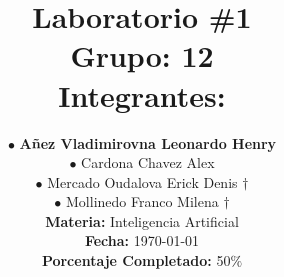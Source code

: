 
\newcommand{\NumeroLaboratorio}{1}		%
\newcommand{\PorcentajeCompletado}{50}	%





\title{
\hspace{-0.1cm}\LARGE{Laboratorio \#\NumeroLaboratorio} \\\vspace{0.05cm}
{\large Grupo: 12} \\\vspace{0.2cm}
{\large Integrantes:} \\\vspace{0.2cm}
}

\author{
\hspace{0.5cm}$\bullet$ \textbf{Añez Vladimirovna Leonardo Henry}\\
\hspace{0.5cm}$\bullet$ Cardona Chavez Alex\\
\hspace{0.5cm}$\bullet$ Mercado Oudalova Erick Denis $\dagger$\\
\hspace{0.5cm}$\bullet$ Mollinedo Franco Milena $\dagger$ \\\vspace{0.2cm}
\textbf{Materia:} Inteligencia Artificial \\\vspace{0.2cm}
\textbf{Fecha:} \today \\\vspace{0.2cm}
\textbf{Porcentaje Completado:} \PorcentajeCompletado$\%$
}
\maketitle
